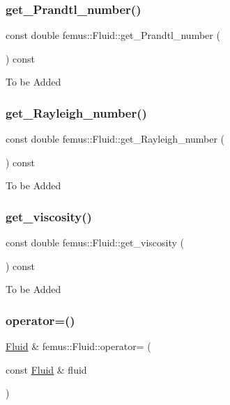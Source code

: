 \subsubsection{\texorpdfstring{get\+\_\+\+Prandtl\+\_\+number()}{get\_Prandtl\_number()}}
{\footnotesize\ttfamily const double femus\+::\+Fluid\+::get\+\_\+\+Prandtl\+\_\+number (\begin{DoxyParamCaption}{ }\end{DoxyParamCaption}) const}

To be Added \mbox{\label{classfemus_1_1_fluid_a64c60efe82b31eefa750265e063e7710}} 
\subsubsection{\texorpdfstring{get\+\_\+\+Rayleigh\+\_\+number()}{get\_Rayleigh\_number()}}
{\footnotesize\ttfamily const double femus\+::\+Fluid\+::get\+\_\+\+Rayleigh\+\_\+number (\begin{DoxyParamCaption}{ }\end{DoxyParamCaption}) const}

To be Added \mbox{\label{classfemus_1_1_fluid_a936acf71f4e2000195c889fe01a3619f}} 
\subsubsection{\texorpdfstring{get\+\_\+viscosity()}{get\_viscosity()}}
{\footnotesize\ttfamily const double femus\+::\+Fluid\+::get\+\_\+viscosity (\begin{DoxyParamCaption}{ }\end{DoxyParamCaption}) const}

To be Added \mbox{\label{classfemus_1_1_fluid_ad8ceb155d9713388b23b58aef5b46a8b}} 
\subsubsection{\texorpdfstring{operator=()}{operator=()}}
{\footnotesize\ttfamily \mbox{\hyperlink{classfemus_1_1_fluid}{Fluid}} \& femus\+::\+Fluid\+::operator= (\begin{DoxyParamCaption}\item[{const \mbox{\hyperlink{classfemus_1_1_fluid}{Fluid}} \&}]{fluid }\end{DoxyParamCaption})}

